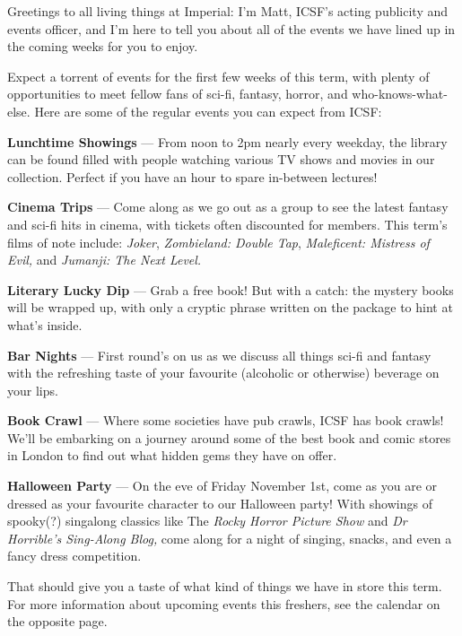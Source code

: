 Greetings to all living things at Imperial: I’m Matt, ICSF’s acting
publicity and events officer, and I’m here to tell you about all of
the events we have lined up in the coming weeks for you to enjoy.

Expect a torrent of events for the first few weeks of this term, with
plenty of opportunities to meet fellow fans of sci-fi, fantasy,
horror, and who-knows-what-else.  Here are some of the regular events
you can expect from ICSF:

\textbf{Lunchtime Showings} ---
From noon to 2pm nearly every weekday, the library can be found filled
with people watching various TV shows and movies in our
collection. Perfect if you have an hour to spare in-between lectures!

\textbf{Cinema Trips} ---
Come along as we go out as a group to see the latest fantasy and
sci-fi hits in cinema, with tickets often discounted for members. This
term’s films of note include: \textit{Joker}, \textit{Zombieland:
Double Tap}, \textit{Maleficent: Mistress of Evil,}
and \textit{Jumanji: The Next Level.}

\textbf{Literary Lucky Dip} ---
Grab a free book! But with a catch: the mystery books will be wrapped
up, with only a cryptic phrase written on the package to hint at
what’s inside.

\textbf{Bar Nights} ---
First round’s on us as we discuss all things sci-fi and fantasy with
the refreshing taste of your favourite (alcoholic or otherwise)
beverage on your lips.

\textbf{Book Crawl} ---
Where some societies have pub crawls, ICSF has book crawls! We’ll be
embarking on a journey around some of the best book and comic stores
in London to find out what hidden gems they have on offer.

\textbf{Halloween Party} ---
On the eve of Friday November 1st, come as you are or dressed as your
favourite character to our Halloween party!  With showings of
spooky(?) singalong classics like The \textit{Rocky Horror Picture
Show} and \textit{Dr Horrible’s Sing-Along Blog,} come along for a
night of singing, snacks, and even a fancy dress competition.

That should give you a taste of what kind of things we have in store
this term. For more information about upcoming events this freshers,
see the calendar on the opposite page.
